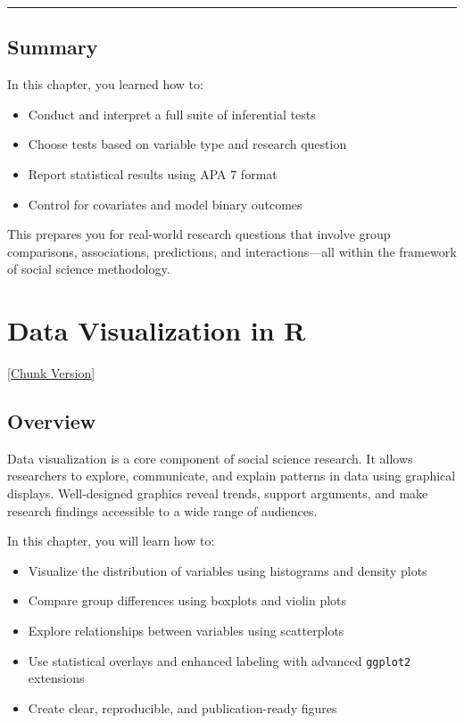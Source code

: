 \documentclass[
]{book}
\providecommand{\tightlist}{%
  \setlength{\itemsep}{0pt}\setlength{\parskip}{0pt}}
\begin{document}
\begin{center}\rule{0.5\linewidth}{0.5pt}\end{center}

\section{Summary}\label{summary-3}

In this chapter, you learned how to:

\begin{itemize}
\tightlist
\item
  Conduct and interpret a full suite of inferential tests
\item
  Choose tests based on variable type and research question
\item
  Report statistical results using APA 7 format
\item
  Control for covariates and model binary outcomes
\end{itemize}

This prepares you for real-world research questions that involve group comparisons, associations, predictions, and interactions---all within the framework of social science methodology.

\chapter{Data Visualization in R}\label{data-visualization-in-r}

\href{files/11-data_visualization-chunk.Rmd}{{[}Chunk Version{]}}

\section{Overview}\label{overview-3}

Data visualization is a core component of social science research. It allows researchers to explore, communicate, and explain patterns in data using graphical displays. Well-designed graphics reveal trends, support arguments, and make research findings accessible to a wide range of audiences.

In this chapter, you will learn how to:

\begin{itemize}
\tightlist
\item
  Visualize the distribution of variables using histograms and density plots
\item
  Compare group differences using boxplots and violin plots
\item
  Explore relationships between variables using scatterplots
\item
  Use statistical overlays and enhanced labeling with advanced \texttt{ggplot2} extensions
\item
  Create clear, reproducible, and publication-ready figures
\end{itemize}
\end{document}
